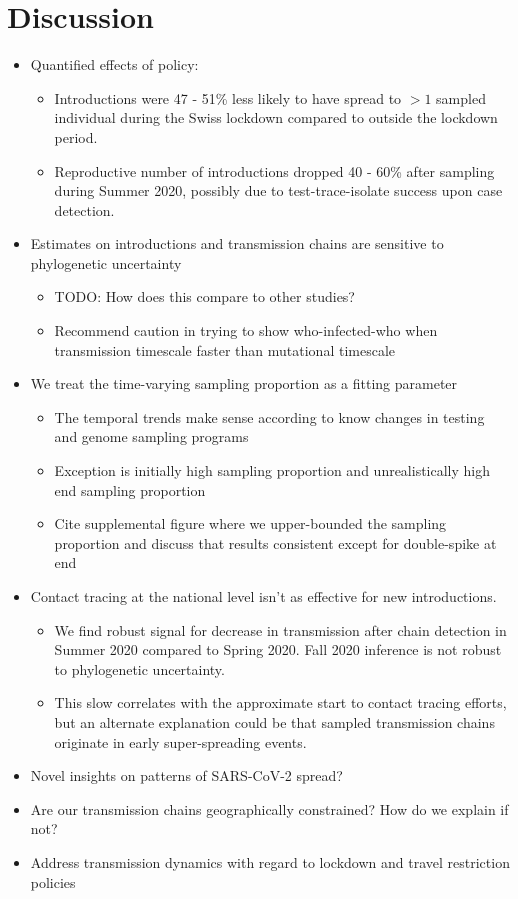 \documentclass[9pt,twocolumn,twoside,lineno]{pnas-new}
\begin{document}
\section{Discussion}
\begin{itemize}
    \item Quantified effects of policy:
    \begin{itemize}
        \item Introductions were 47 - 51\% less likely to have spread to $>1$ sampled individual during the Swiss lockdown compared to outside the lockdown period.
        \item Reproductive number of introductions dropped 40 - 60\% after sampling during Summer 2020, possibly due to test-trace-isolate success upon case detection. 
    \end{itemize}
    \item Estimates on introductions and transmission chains are sensitive to phylogenetic uncertainty
    \begin{itemize}
        \item TODO: How does this compare to other studies?
        \item Recommend caution in trying to show who-infected-who when transmission timescale faster than mutational timescale
    \end{itemize}
    \item We treat the time-varying sampling proportion as a fitting parameter
    \begin{itemize}
        \item The temporal trends make sense according to know changes in testing and genome sampling programs
        \item Exception is initially high sampling proportion and unrealistically high end sampling proportion
        \item Cite supplemental figure where we upper-bounded the sampling proportion and discuss that results consistent except for double-spike at end
    \end{itemize}
    \item Contact tracing at the national level isn't as effective for new introductions.
    \begin{itemize}
        \item We find robust signal for decrease in transmission after chain detection in Summer 2020 compared to Spring 2020. Fall 2020 inference is not robust to phylogenetic uncertainty. 
        \item This slow correlates with the approximate start to contact tracing efforts, but an alternate explanation could be that sampled transmission chains originate in early super-spreading events.
    \end{itemize}
    \item Novel insights on patterns of SARS-CoV-2 spread?
    \item Are our transmission chains geographically constrained? How do we explain if not?
    \item Address transmission dynamics with regard to lockdown and travel restriction policies
\end{itemize}
\end{document}
